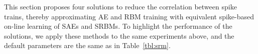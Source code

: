 This section proposes four solutions to reduce the correlation between spike trains, thereby approximating AE and RBM training with equivalent spike-based on-line learning of SAEs and SRBMs.
To highlight the performance of the solutions, we apply these methods to the same experiments above, and the default parameters are the same as in Table~\ref{tbl:srm}.
\begin{figure}
	\centering
	\begin{subfigure}[c]{0.48\textwidth}\raggedleft
		\\
		\\

\end{subfigure}
\end{figure}

